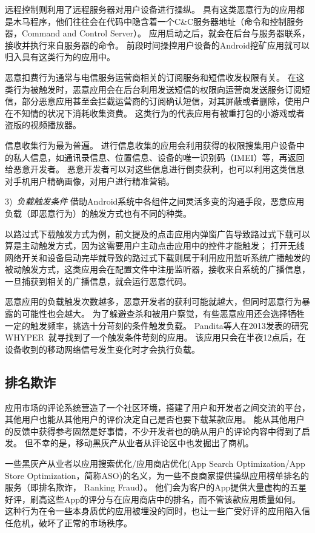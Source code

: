 远程控制则利用了远程服务器对用户设备进行操纵。
具有这类恶意行为的应用都是木马程序，他们往往会在代码中隐含着一个C\&C服务器地址（命令和控制服务器，Command and Control Server）。
应用启动之后，就会在后台与服务器联系，接收并执行来自服务器的命令。
前段时间操控用户设备的Android挖矿应用就可以归入具有这类行为的应用中。

恶意扣费行为通常与电信服务运营商相关的订阅服务和短信收发权限有关。
在这类行为被触发时，恶意应用会在后台利用发送短信的权限向运营商发送服务订阅短信，部分恶意应用甚至会拦截运营商的订阅确认短信，对其屏蔽或者删除，使用户在不知情的状况下消耗收集资费。
这类行为的代表应用有被重打包的小游戏或者盗版的视频播放器。

信息收集行为最为普遍。
进行信息收集的应用会利用获得的权限搜集用户设备中的私人信息，如通讯录信息、位置信息、设备的唯一识别码（IMEI）等，再返回给恶意开发者。
恶意开发者可以对这些信息进行倒卖获利，也可以利用这类信息对手机用户精确画像，对用户进行精准营销。

3)\ \emph{负载触发条件} \quad
借助Android系统中各组件之间灵活多变的沟通手段，恶意应用负载（即恶意行为）的触发方式也有不同的种类。

以路过式下载触发方式为例，前文提及的点击应用内弹窗广告导致路过式下载可以算是主动触发方式，因为这需要用户主动点击应用中的控件才能触发；
打开无线网络开关和设备启动完毕就导致的路过式下载则属于利用应用监听系统广播触发的被动触发方式，这类应用会在配置文件中注册监听器，接收来自系统的广播信息，一旦捕获到相关的广播信息，就会运行恶意代码。

恶意应用的负载触发次数越多，恶意开发者的获利可能就越大，但同时恶意行为暴露的可能性也会越大。
为了躲避查杀和被用户察觉，有些恶意应用还会选择牺牲一定的触发频率，挑选十分苛刻的条件触发负载。
Pandita等人在2013发表的研究WHYPER~\cite{pandita2013whyper}就寻找到了一个触发条件苛刻的应用。
该应用只会在半夜12点后，在设备收到的移动网络信号发生变化时才会执行负载。

\subsection{排名欺诈}
应用市场的评论系统营造了一个社区环境，搭建了用户和开发者之间交流的平台，其他用户也能从其他用户的评价决定自己是否也要下载某款应用。
能从其他用户的反馈中获得参考固然是好事情，不少开发者也的确从用户的评论内容中得到了启发。
但不幸的是，移动黑灰产从业者从评论区中也发掘出了商机。

一些黑灰产从业者以应用搜索优化/应用商店优化(App Search Optimization/App Store Optimization，简称ASO)的名义，为一些不良商家提供操纵应用榜单排名的服务（即排名欺诈， Ranking Fraud）。
他们会为客户的App提供大量虚构的五星好评，刷高这些App的评分与在应用商店中的排名，而不管该款应用质量如何。
这种行为在令一些本身质优的应用被埋没的同时，也让一些广受好评的应用陷入信任危机，破坏了正常的市场秩序。

